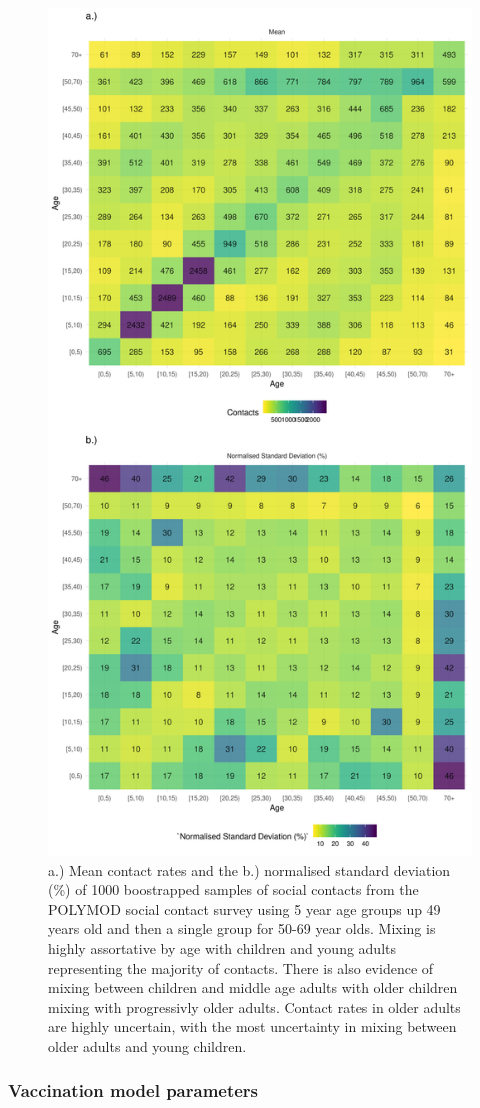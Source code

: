 \documentclass[11pt,twoside]{bristolthesis}
\begin{document}
  \begin{figure}
  
  {\centering \includegraphics[width=0.8\linewidth]{chapters/model-development/resources/figure/contact_matrix} 
  
  }
  
  \caption{a.) Mean contact rates and the b.) normalised standard deviation (\%) of 1000 boostrapped samples of  social contacts from the POLYMOD social contact survey using 5 year age groups up 49 years old and then a single group for 50-69 year olds. Mixing is highly assortative by age with children and young adults representing the majority of contacts. There is also evidence of mixing between children and middle age adults with older children mixing with progressivly older adults. Contact rates in older adults are highly uncertain, with the most uncertainty in mixing between older adults and young children.}\label{fig:contact-tile-plot}
  \end{figure}
  \hypertarget{vaccination-model-parameters}{%
  \subsubsection{Vaccination model parameters}\label{vaccination-model-parameters}}
  
\end{document}
